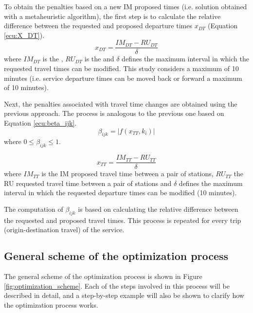 \documentclass[Afour,sagev,times]{sagej}
\begin{document}
To obtain the penalties based on a new \gls{IM} proposed times (i.e. solution obtained with a metaheuristic algorithm), the first step is to calculate the relative difference between the requested and proposed departure times $ x_{DT} $ (Equation \ref{ecu:X_DT}).
\begin{equation}\label{ecu:X_DT}
    x_{DT} = \frac{IM_{DT} - RU_{DT} }{\delta}
\end{equation}
\noindent where $ IM_{DT} $ is the , $ RU_{DT} $ is the  and $ \delta $ defines the maximum interval in which the requested travel times can be modified. This study considers a maximum of 10 minutes (i.e. service departure times can be moved back or forward a maximum of 10 minutes).


Next, the penalties associated with travel time changes are obtained using the previous approach. The process is analogous to the previous one based on Equation \ref{ecu:beta_ijk}.
\begin{equation}\label{ecu:beta_ijk}
    \beta_{ijk} =  |f(x_{TT}, k_i)|
\end{equation}
\noindent where $ 0 \leq \beta_{ijk} \leq 1 $.

\begin{equation}\label{ecu:X_TT}
    x_{TT} = \frac{IM_{TT} - RU_{TT}}{\delta}
\end{equation}
\noindent where $IM_{TT}$ is the \gls{IM} proposed travel time between a pair of stations, $RU_{TT}$ the \gls{RU} requested travel time between a pair of stations and  $ \delta $ defines the maximum interval in which the requested departure times can be modified (10 minutes).


The computation of $\beta_{ijk}$ is based on calculating the relative difference between the requested and proposed travel times. This process is repeated for every trip (origin-destination travel) of the service.

\subsection{General scheme of the optimization process}
\label{sec:general_scheme}

The general scheme of the optimization process is shown in Figure \ref{fig:optimization_scheme}. Each of the steps involved in this process will be described in detail, and a step-by-step example will also be shown to clarify how the optimization process works.
\end{document}

